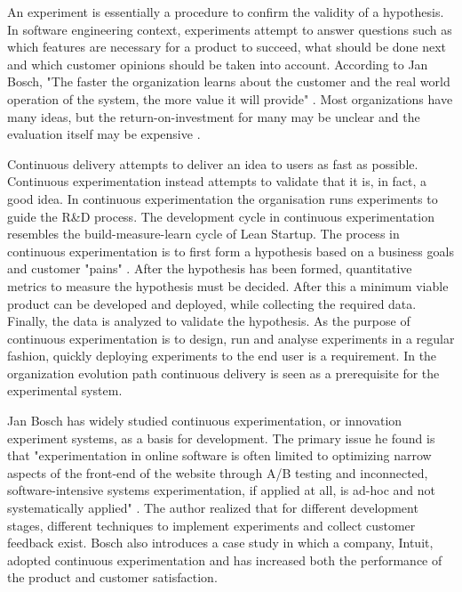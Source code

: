 \documentclass[english]{tktltiki2}
\theoremstyle{definition}
\theoremstyle{remark}
\begin{document}

An experiment is essentially a procedure to confirm the validity of a hypothesis. In software engineering context, experiments attempt to answer questions such as which features are necessary for a product to succeed, what should be done next and which customer opinions should be taken into account. According to Jan Bosch, "The faster the organization learns about the customer and the real world operation of the system, the more value it will provide" \cite{bosch2012building}. Most organizations have many ideas, but the return-on-investment for many may be unclear and the evaluation itself may be expensive \cite{kohavi2007practical}. 

Continuous delivery attempts to deliver an idea to users as fast as possible. Continuous experimentation instead attempts to validate that it is, in fact, a good idea. In continuous experimentation the organisation runs experiments to guide the R\&D process. The development cycle in continuous experimentation resembles the build-measure-learn cycle of Lean Startup. The process in continuous experimentation is to first form a hypothesis based on a business goals and customer "pains" \cite{bosch2012building}. After the hypothesis has been formed, quantitative metrics to measure the hypothesis must be decided. After this a minimum viable product can be developed and deployed, while collecting the required data. Finally, the data is analyzed to validate the hypothesis. As the purpose of continuous experimentation is to design, run and analyse experiments in a regular fashion, quickly deploying experiments to the end user is a requirement. In the organization evolution path \cite{olsson2012climbing} continuous delivery is seen as a prerequisite for the experimental system. 

Jan Bosch has widely studied continuous experimentation, or innovation experiment systems, as a basis for development. The primary issue he found is that "experimentation in online software is often limited to optimizing narrow aspects of the front-end of the website through A/B testing and inconnected, software-intensive systems experimentation, if applied at all, is ad-hoc and not systematically applied" \cite{bosch2012building}. The author realized that for different development stages, different techniques to implement experiments and collect customer feedback exist. Bosch also introduces a case study in which a company, Intuit, adopted continuous experimentation and has increased both the performance of the product and customer satisfaction.
\end{document}
